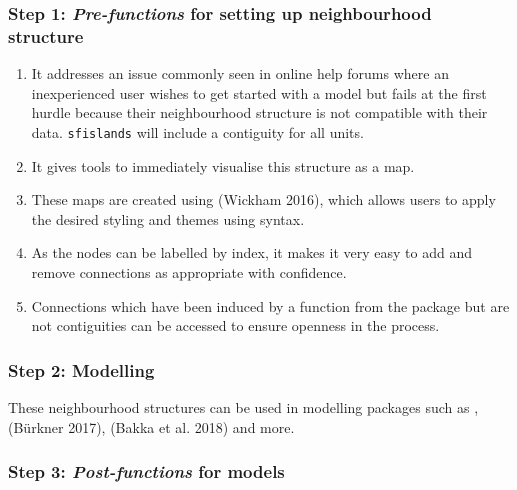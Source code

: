 \hypertarget{step-1-pre-functions-for-setting-up-neighbourhood-structure}{%
\subsubsection{\texorpdfstring{Step 1: \emph{Pre-functions} for setting up neighbourhood structure}{Step 1: Pre-functions for setting up neighbourhood structure}}\label{step-1-pre-functions-for-setting-up-neighbourhood-structure}}

\begin{enumerate}
\def\labelenumi{\arabic{enumi}.}
\item
  It addresses an issue commonly seen in online help forums where an inexperienced user wishes to get started with a model but fails at the first hurdle because their neighbourhood structure is not compatible with their data. \texttt{sfislands} will include a contiguity for all units.
\item
  It gives tools to immediately visualise this structure as a map.
\item
  These maps are created using  (Wickham 2016), which allows users to apply the desired styling and themes using  syntax.
\item
  As the nodes can be labelled by index, it makes it very easy to add and remove connections as appropriate with confidence.
\item
  Connections which have been induced by a function from the package but are not contiguities can be accessed to ensure openness in the process.
\end{enumerate}

\hypertarget{step-2-modelling}{%
\subsubsection{Step 2: Modelling}\label{step-2-modelling}}

These neighbourhood structures can be used in modelling packages such as ,  (Bürkner 2017),  (Bakka et al. 2018) and more.

\hypertarget{step-3-post-functions-for-models}{%
\subsubsection{\texorpdfstring{Step 3: \emph{Post-functions} for models}{Step 3: Post-functions for models}}\label{step-3-post-functions-for-models}}

